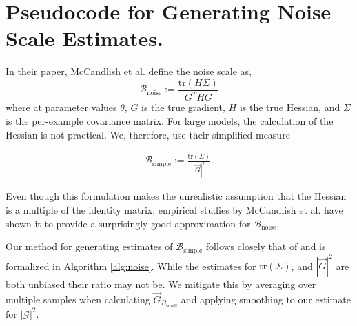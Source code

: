\documentclass{article}
\newcommand{\gbs}[0]{\ensuremath{\vec{G}_{B_{\text{small}}}}\xspace}
\newcommand{\bs}[0]{\ensuremath{\mathcal{B}_\text{simple}}\xspace}
\newcommand{\bn}[0]{\ensuremath{\mathcal{B}_\text{noise}}\xspace}
\begin{document}
\section{Pseudocode for Generating Noise Scale Estimates.}
\label{app:noise_estimate}

In their paper, McCandlish et al. \cite{mccandlish2018empirical} define the noise scale as,
\begin{equation}
    \bn := \frac{\text{tr}(H\Sigma)}{G^THG}
\end{equation}
where at parameter values $\theta$, $G$ is the true gradient, $H$ is the true Hessian, and $\Sigma$ is the per-example covariance matrix. For large models, the calculation of the Hessian is not practical. We, therefore, use their simplified measure 

\begin{align}
    \bs := \frac{\text{tr}(\Sigma)}{|\vec{G}|^2}.
\end{align}

Even though this formulation makes the unrealistic assumption that the Hessian is a multiple of the identity matrix, empirical studies by McCandlish et al. have shown it to provide a surprisingly good approximation for $\bn$. 

Our method for generating estimates of $\bs$ follows closely that of \cite{mccandlish2018empirical} and is formalized in Algorithm \ref{alg:noise}. 
While the estimates for $\text{tr}(\Sigma)$, and ${|\vec{G}|^2}$ are both unbiased their ratio may not be. We mitigate this by averaging over multiple samples when calculating $\gbs$ and applying smoothing to our estimate for ${|\mathcal{G}|^2}$.
\end{document}
